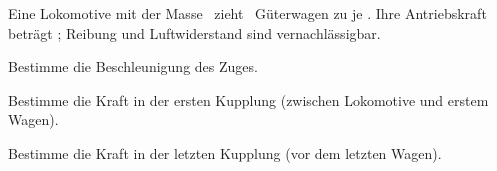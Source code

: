 Eine Lokomotive mit der Masse \mLoO\ zieht \nWO\ Güterwagen zu je \mWgO. Ihre Antriebskraft beträgt \FAO; Reibung und Luftwiderstand sind vernachlässigbar.

\begin{abcliste}
\abc
Bestimme die Beschleunigung des Zuges.

\abc
Bestimme die Kraft in der ersten Kupplung (zwischen Lokomotive und erstem Wagen).

\abc
Bestimme die Kraft in der letzten Kupplung (vor dem letzten Wagen).
\end{abcliste}
